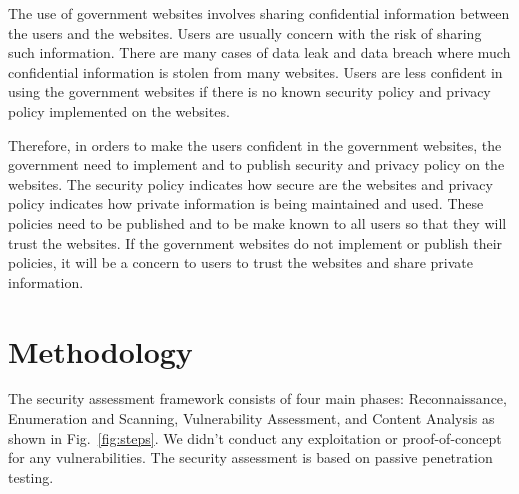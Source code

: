 \documentclass[conference]{IEEEtran}
\begin{document}
The use of government websites involves sharing confidential
information between the users and the websites. Users are usually
concern with the risk of sharing such information. There are many
cases of data leak and data breach where much confidential information
is stolen from many websites. Users are less confident in using the
government websites if there is no known security policy and privacy
policy implemented on the websites\cite{zhao2010opportunities}.

Therefore, in orders to make the users confident in the government
websites, the government need to implement and to publish security and
privacy policy on the websites. The security policy indicates how
secure are the websites and privacy policy indicates how private
information is being maintained and used. These policies need to be
published and to be make known to all users so that they will trust
the websites. If the government websites do not implement or publish
their policies, it will be a concern to users to trust the websites
and share private information\cite{zhao2010opportunities}.







\section{Methodology}

The security assessment framework consists of four main phases:
Reconnaissance, Enumeration and Scanning, Vulnerability Assessment,
and Content Analysis as shown in Fig.~\ref{fig:steps}. We didn't
conduct any exploitation or proof-of-concept for any
vulnerabilities. The security assessment is based on passive
penetration testing\cite{weidman2014penetration}.
\end{document}
